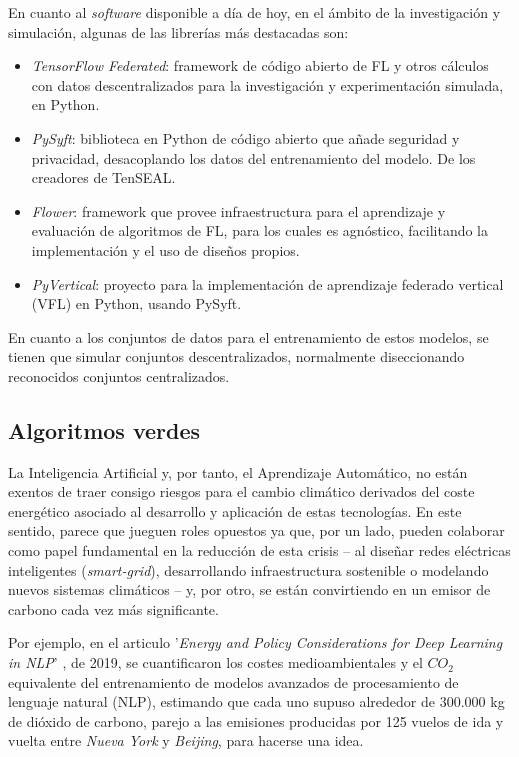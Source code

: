 \documentclass[00-Trabajo_Final.tex]{subfiles}
\begin{document}
\vspace{1em}

En cuanto al \textit{software} disponible a día de hoy, en el ámbito de la investigación y simulación, algunas de las librerías más destacadas son:

\begin{itemize}[itemsep=2pt, topsep=2pt]
    \item \textit{TensorFlow Federated}: framework de código abierto de FL y otros cálculos con datos descentralizados para la investigación y experimentación simulada, en Python.
    \item \textit{PySyft}: biblioteca en Python de código abierto que añade seguridad y privacidad, desacoplando los datos del entrenamiento del modelo. De los creadores de TenSEAL.
    \item \textit{Flower}: framework que provee infraestructura para el aprendizaje y evaluación de algoritmos de FL, para los cuales es agnóstico, facilitando la implementación y el uso de diseños propios.
    \item \textit{PyVertical}: proyecto para la implementación de aprendizaje federado vertical (VFL) en Python, usando PySyft.
\end{itemize}

En cuanto a los conjuntos de datos para el entrenamiento de estos modelos, se tienen que simular conjuntos descentralizados, normalmente diseccionando reconocidos conjuntos centralizados.

\subsection{Algoritmos verdes}

La Inteligencia Artificial y, por tanto, el Aprendizaje Automático, no están exentos de traer consigo riesgos para el cambio climático derivados del coste energético asociado al desarrollo y aplicación de estas tecnologías. En este sentido, parece que jueguen roles opuestos ya que, por un lado, pueden colaborar como papel fundamental en la reducción de esta crisis{ }--{ }al diseñar redes eléctricas inteligentes (\textit{smart-grid}), desarrollando infraestructura sostenible o modelando nuevos sistemas climáticos{ }--{ }y, por otro, se están convirtiendo en un emisor de carbono cada vez más significante.

Por ejemplo, en el articulo '\textit{Energy and Policy Considerations for Deep Learning in NLP}' \cite{energy_ml}, de 2019, se cuantificaron los costes medioambientales y el $CO_2$ equivalente del entrenamiento de modelos avanzados de procesamiento de lenguaje natural (NLP), estimando que cada uno supuso alrededor de $300.000$ kg de dióxido de carbono, parejo a las emisiones producidas por 125 vuelos de ida y vuelta entre \textit{Nueva York} y \textit{Beijing}, para hacerse una idea.
\end{document}

